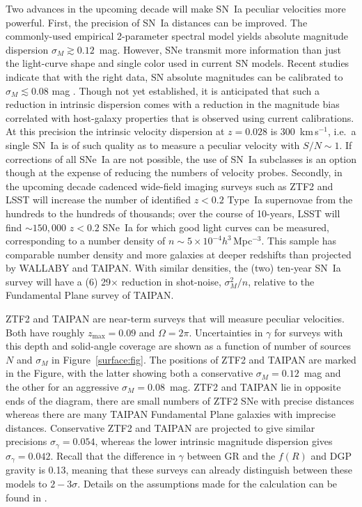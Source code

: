 \documentclass[11pt, oneside]{article}   	%
\begin{document}
Two advances in the upcoming decade will make SN~Ia peculiar velocities more powerful.
First, the precision of SN~Ia distances can be improved.  The commonly-used empirical 2-parameter spectral model yields  absolute magnitude
dispersion $\sigma_M \gtrsim 0.12$~mag.  However, SNe transmit more information than just the light-curve shape and single color used in current SN models.
Recent studies indicate that with the right data, SN absolute
magnitudes can be calibrated to $\sigma_M \lesssim 0.08$ mag \cite[see e.g.][]{2012MNRAS.425.1007B, 2015ApJ...815...58F}. 
Though not yet
established, it is anticipated that such a reduction in intrinsic dispersion comes with a reduction in the magnitude bias correlated with host-galaxy properties
that is observed using current calibrations.  At this precision the intrinsic velocity dispersion  at $z=0.028$ is  $300$~km\,s$^{-1}$, i.e.\ a single SN~Ia  is of such quality as to
measure a peculiar velocity with $S/N \sim 1$.
 If corrections of all SNe~Ia are not possible, the use of SN~Ia subclasses is an option though at the expense of reducing the
numbers of velocity probes.
Secondly,  in the upcoming decade cadenced wide-field imaging surveys such as ZTF2 and LSST
  will increase the number of identified  $z<0.2$ Type~Ia supernovae from the hundreds to the
hundreds of thousands; over the course of 10-years, LSST will find $\sim150,000$ $z<0.2$ SNe~Ia
 for which good light curves can be measured, corresponding to a  number density of $n \sim 5\times 10^{-4}h^3$\,Mpc$^{-3}$.
  This sample has comparable
 number density and more galaxies at deeper redshifts than projected by WALLABY and TAIPAN.  With similar densities,
 the (two) ten-year SN~Ia survey will have
 a (6) 29$\times$ reduction in shot-noise, $\sigma^2_M/n$, relative to the Fundamental Plane survey of TAIPAN.



ZTF2 and TAIPAN are near-term surveys that will measure peculiar velocities.  Both have roughly
 $z_{\text{max}}=0.09$ and $\Omega = 2\pi$.
Uncertainties in $\gamma$ for surveys with this depth and solid-angle coverage 
are shown as a function of number of sources $N$ and $\sigma_M$ in Figure~\ref{surface:fig}. The positions of ZTF2 and TAIPAN are marked
in the Figure, with the latter showing both  a conservative $\sigma_M=0.12$~mag and the other for an aggressive $\sigma_M=0.08$~mag.
ZTF2 and TAIPAN lie in opposite ends of the diagram, there are small numbers of ZTF2 SNe with precise distances
whereas there are many TAIPAN Fundamental Plane galaxies with imprecise distances. 
Conservative ZTF2 and TAIPAN
are projected to give similar precisions $\sigma_ \gamma = 0.054$, whereas  the lower intrinsic magnitude dispersion  gives
$\sigma_ \gamma = 0.042$.  
Recall that the difference in $\gamma$  between GR and the $f(R)$ and DGP gravity is 0.13, meaning that these surveys
can already distinguish between these models to $2-3 \sigma$.
Details
on the assumptions made for the calculation can be found in \cite{2019BAAS...51c.140K}.
\end{document}
